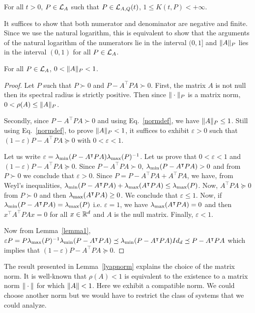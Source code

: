 \documentclass[10pt]{article}
\begin{document}
\begin{prop}
For all $t>0$, $P\in \mathcal{L}_{A}$ such that $P\in \mathcal{L}_{A,Q}(t)$, $1\leq K(t,P)< +\infty$.  
\end{prop}

It suffices to show that both numerator and denominator are negative and finite. Since we use the natural logarithm, this is equivalent to show that the arguments of the natural logarithm of the numerators lie in the interval $(0,1]$ and $\| A\|_P$ lies in the interval $(0,1)$ for all $P\in\mathcal{L}_{A}$. 

\begin{lemma}
\label{lyapnorm}
For all $P\in\mathcal{L}_{A}$, $0<\| A\|_P<1$. 
\end{lemma}

\begin{proof}
Let $P$ such that $P\succ 0$ and $P-A^\intercal P A\succ 0$.  First, the matrix $A$ is not null then its spectral radius is strictly positive. Then since $\| \cdot\|_P$ is a matrix norm, $0<\rho(A) \leq \| A\|_P$.

Secondly, since $P-A^\intercal P A\succ 0$ and using Eq.~\eqref{normdef}, we have $\| A\|_P\leq 1$. Still using Eq.~\eqref{normdef}, to prove $\| A\|_P<1$, it suffices to exhibit $\varepsilon>0$ such that $(1-\varepsilon) P-A^\intercal P A\succeq 0$ with $0<\varepsilon<1$. 

Let us write $\varepsilon=\lambda_{\operatorname{min}}(P-A^\intercal P A) \lambda_{\operatorname{max}}(P)^{-1}$. Let us prove that $0<\varepsilon<1$ and $(1-\varepsilon) P-A^\intercal P A\succeq 0$.  Since $P-A^\intercal P A\succ 0$, $\lambda_{\operatorname{min}}(P-A^\intercal P A)>0$ and from $P\succ 0$ we conclude that $\varepsilon >0$. Since $P=P-A^ \intercal P A +A^\intercal P A$, we have, from Weyl's inequalities, $\lambda_{\operatorname{min}}(P-A^\intercal P A)+\lambda_{\operatorname{max}}(A^\intercal P A)\leq \lambda_{\operatorname{max}}(P)$. Now, $A^\intercal P A\succeq 0$ from $P\succ 0$ and then $\lambda_{\operatorname{max}}(A^\intercal P A)\geq 0$. We conclude that $\varepsilon\leq 1$. Now, if $\lambda_{\operatorname{min}}(P-A^\intercal P A)=\lambda_{\operatorname{max}}(P)$ i.e. $\varepsilon=1$, we have 
$\lambda_{\operatorname{max}}(A^\intercal P A)=0$ and then $x^\intercal A^\intercal P A x=0$ for all $x\in \mathbb R^d$ and $A$ is the null matrix. 
Finally, $\varepsilon<1$. 

Now from Lemma~\ref{lemma1}, $\varepsilon P=P\lambda_{\operatorname{max}}(P)^{-1}\lambda_{\operatorname{min}}(P-A^\intercal P A)\preceq \lambda_{\operatorname{min}}(P-A^\intercal P A)Id_d\preceq 
P-A^\intercal P A$ which implies that $(1-\varepsilon) P -A^\intercal P A\succeq 0$. 
\end{proof}

The result presented in Lemma~\ref{lyapnorm} explains the choice of the matrix norm. It is well-known that $\rho(A)<1$ is equivalent to the existence to a matrix norm $\| \cdot\|$ for which $\| A\|<1$. Here we exhibit a compatible norm. We could choose another norm but we would have to restrict the class of systems that we could analyze.    
\end{document}
